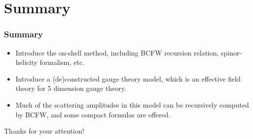 \documentclass{beamer}
\begin{document}
\section{Summary}
\begin{frame}
    \frametitle{Summary}
    \begin{itemize}
        \item Introduce the on-shell method, including BCFW recursion relation, spinor-helicity formalism, etc.
        \item Introduce a (de)constructed gauge theory model, which is an effective field theory for 5 dimension gauge theory.
        \item Much of the scattering amplitudes in this model can be recursively computed by BCFW, and some compact formulas are offered.
    \end{itemize}
\end{frame}
\begin{frame}
    \centering
    \Huge Thanks for your attention!
\end{frame} 
\appendix
\end{document}
